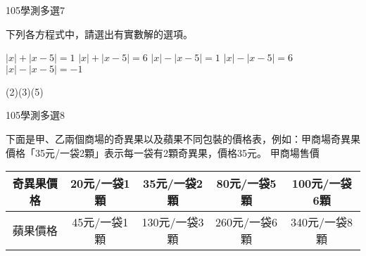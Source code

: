 \begin{QUESTIONS}
    \begin{QUESTION}
        \begin{ExamInfo}{105}{學測}{多選}{7}
        \end{ExamInfo}
        \begin{ExamAnsRateInfo}{54}{81}{52}{29}
        \end{ExamAnsRateInfo}
        \begin{QBODY}
			下列各方程式中，請選出有實數解的選項。
			\begin{QOPS}
				\QOP $\left| x \right|+\left| x-5 \right|=1$
				\QOP $\left| x \right|+\left| x-5 \right|=6$
				\QOP $\left| x \right|-\left| x-5 \right|=1$
				\QOP $\left| x \right|-\left| x-5 \right|=6$
				\QOP $\left| x \right|-\left| x-5 \right|=-1$
			\end{QOPS}
        \end{QBODY}
        \begin{QFROMS}
        \end{QFROMS}
        \begin{QTAGS}\end{QTAGS}
        \begin{QANS}
            (2)(3)(5)
        \end{QANS}
        \begin{QSOLLIST}
        \end{QSOLLIST}
        \begin{QEMPTYSPACE}
        \end{QEMPTYSPACE}
    \end{QUESTION}
    \begin{QUESTION}
        \begin{ExamInfo}{105}{學測}{多選}{8}
        \end{ExamInfo}
        \begin{ExamAnsRateInfo}{59}{77}{60}{40}
        \end{ExamAnsRateInfo}
        \begin{QBODY}
			下面是甲、乙兩個商場的奇異果以及蘋果不同包裝的價格表，例如：甲商場奇異果價格「35元/一袋2顆」表示每一袋有2顆奇異果，價格35元。
			甲商場售價
			\begin{tabular}{|c|c|c|c|c|}
			\hline
				奇異果價格	& 20元/一袋1顆	& 35元/一袋2顆	& 80元/一袋5顆	& 100元/一袋6顆 \\\hline
				蘋果價格	& 45元/一袋1顆	& 130元/一袋3顆	& 260元/一袋6顆	& 340元/一袋8顆 \\\hline
			\end{tabular}

\end{QBODY}
\end{QUESTION}
\end{QUESTIONS}
